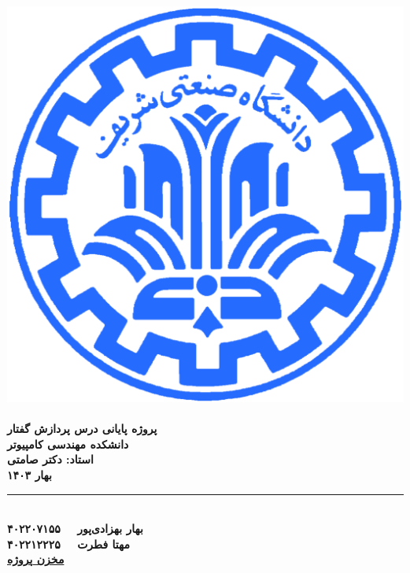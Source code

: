 \documentclass[fleqn]{report}
\begin{document}
\begin{titlepage}
    \begin{center}
        \includegraphics{sharif.png}\\
        \vspace{1cm}    \textbf{\LARGE   {}}\\
        \vspace{1cm}  \textbf{\Large  پروژه پایانی درس پردازش گفتار}\\
        \vspace{1cm}    \textbf{\large  دانشکده مهندسی کامپیوتر}\\
        \vspace{0.5cm}  \textbf{\large  استاد: دکتر صامتی}\\
        \vspace{0.5cm}  \textbf{\large  بهار ۱۴۰۳}\\
        \vspace{0.5cm}  \noindent\rule{8cm}{0.4pt}\\
        \vspace{0.5cm}    \textbf{\large بهار بهزادی‌پور \ \   ۴۰۲۲۰۷۱۵۵}\\
        \vspace{0.5cm}    \textbf{\large مهتا فطرت \ \   ۴۰۲۲۱۲۲۲۵}\\
        \vspace{2cm}    \textbf{\large \href{https://github.com/MahtaFetrat/Speech-Enhancement-and-Denoisnig}{مخزن پروژه}}\\
    \end{center}
\end{titlepage}
\end{document}
